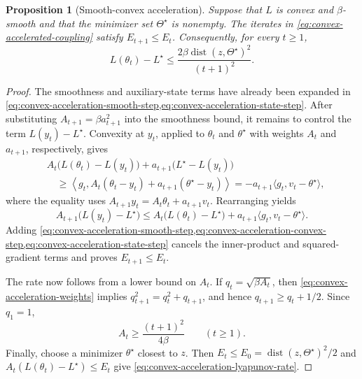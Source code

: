 \documentclass[11pt,twoside]{article}
\newtheorem{proposition}[theorem]{Proposition}
\theoremstyle{definition}
\theoremstyle{remark}
\begin{document}
\begin{proposition}[Smooth-convex acceleration]
\label{prop:smooth-convex-acceleration}
Suppose that $L$ is convex and $\beta$-smooth and that the minimizer set
$\Theta^\star$ is nonempty. The iterates in
\cref{eq:convex-accelerated-coupling} satisfy $E_{t+1}\le E_t$. Consequently,
for every $t\ge1$,
\begin{equation}
 L(\theta_t)-L^\star
 \le\frac{2\beta\operatorname{dist}(z,\Theta^\star)^2}{(t+1)^2}.
 \label{eq:convex-acceleration-lyapunov-rate}
\end{equation}
\end{proposition}

\begin{proof}
The smoothness and auxiliary-state terms have already been expanded in
\cref{eq:convex-acceleration-smooth-step,eq:convex-acceleration-state-step}.
After substituting $A_{t+1}=\beta a_{t+1}^2$ into the smoothness bound, it
remains to control the term $L(y_t)-L^\star$.
Convexity at $y_t$, applied to $\theta_t$ and $\theta^\star$ with weights
$A_t$ and $a_{t+1}$, respectively, gives
\begin{align*}
 &A_t\bigl(L(\theta_t)-L(y_t)\bigr)
 +a_{t+1}\bigl(L^\star-L(y_t)\bigr)\\
 &\quad\ge\left\langle g_t,
 A_t(\theta_t-y_t)+a_{t+1}(\theta^\star-y_t)\right\rangle
 =-a_{t+1}\langle g_t,v_t-\theta^\star\rangle,
\end{align*}
where the equality uses
$A_{t+1}y_t=A_t\theta_t+a_{t+1}v_t$. Rearranging yields
\begin{equation}
 A_{t+1}\bigl(L(y_t)-L^\star\bigr)
 \le A_t\bigl(L(\theta_t)-L^\star\bigr)
 +a_{t+1}\langle g_t,v_t-\theta^\star\rangle.
 \label{eq:convex-acceleration-convex-step}
\end{equation}
Adding
\cref{eq:convex-acceleration-smooth-step,eq:convex-acceleration-convex-step,eq:convex-acceleration-state-step}
cancels the inner-product and squared-gradient terms and proves
$E_{t+1}\le E_t$.

The rate now follows from a lower bound on $A_t$. If
$q_t=\sqrt{\beta A_t}$, then
\cref{eq:convex-acceleration-weights} implies
$q_{t+1}^2=q_t^2+q_{t+1}$, and hence
$q_{t+1}\ge q_t+1/2$. Since $q_1=1$,
\begin{equation}
 A_t\ge\frac{(t+1)^2}{4\beta}
 \qquad(t\ge1).
 \label{eq:convex-acceleration-weight-growth}
\end{equation}
Finally, choose a minimizer $\theta^\star$ closest to $z$. Then
$E_t\le E_0=\operatorname{dist}(z,\Theta^\star)^2/2$ and
$A_t(L(\theta_t)-L^\star)\le E_t$ give
\cref{eq:convex-acceleration-lyapunov-rate}.
\end{proof}
\end{document}
